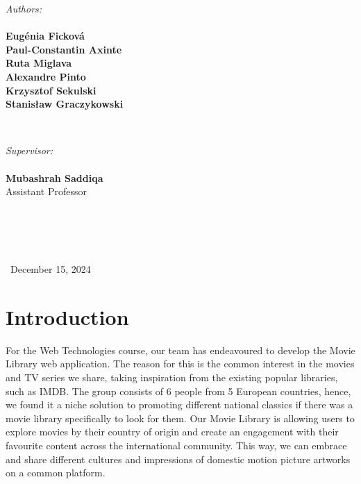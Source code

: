 \documentclass[letterpaper,twocolumn]{article}
\begin{document}
\begin{titlepage}
\begin{minipage}{0.4\textwidth}
\begin{flushleft} \large
\emph{Authors:}
\\\textbf{}
\\\textbf{Eugénia Ficková}
\\\textbf{Paul-Constantin Axinte}
\\\textbf{Ruta Miglava}
\\\textbf{Alexandre Pinto}
\\\textbf{Krzysztof Sekulski}
\\\textbf{Stanisław Graczykowski}


\end{flushleft}
\end{minipage}
~
\begin{minipage}{0.4\textwidth}
\begin{flushright} \large
\emph{Supervisor:} 
\\\textbf{}
\\\textbf{Mubashrah Saddiqa}
\\Assistant Professor
\\\textbf{}
\\\textbf{}
\\\textbf{}
\\\textbf{}


\end{flushright}
\end{minipage}\\[3cm]




\centering
\large \ December 15, 2024


\vfill %

\end{titlepage}




\section{Introduction}

For the Web Technologies course, our team has endeavoured to develop the Movie Library web application. The reason for this is the common interest in the movies and TV series we share, taking inspiration from the existing popular libraries, such as IMDB. The group consists of 6 people from 5 European countries, hence, we found it a niche solution to promoting different national classics if there was a movie library specifically to look for them. Our Movie Library is allowing users to explore movies by their country of origin and create an engagement with their favourite content across the international community. This way, we can embrace and share different cultures and impressions of domestic motion picture artworks on a common platform.
\end{document}
